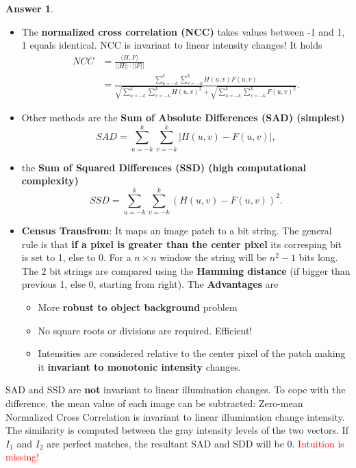 \documentclass[a4paper,12 pt]{article}
\theoremstyle{definition}
\theoremstyle{remark}
\theoremstyle{definition}
\theoremstyle{definition}
\theoremstyle{definition}
\theoremstyle{definition}
\theoremstyle{remark}
\theoremstyle{remark}
\theoremstyle{definition}
\theoremstyle{definition}
\newtheorem*{answer}{Answer}
\begin{document}
\begin{enumerate}
\begin{answer}
\begin{itemize}
\
\item The \textbf{normalized cross correlation (NCC)} takes values between -1 and 1, 1 equals identical. NCC is invariant to linear intensity changes! It holds
\begin{equation}
\begin{split}
NCC&=\frac{\langle H,F \rangle}{||H||\cdot ||F||}\\
&=\frac{\sum_{u=-k}^{k}\sum_{v=-k}^{k}H(u,v)F(u,v)}{\sqrt{\sum_{u=-k}^{k}\sum_{v=-k}^{k}H(u,v)^2}+\sqrt{\sum_{u=-k}^{k}\sum_{v=-k}^{k}F(u,v)^2}}.
\end{split}
\end{equation}
\item Other methods are the \textbf{Sum of Absolute Differences (SAD) (simplest)}
\begin{equation}
SAD=\sum_{u=-k}^{k}\sum_{v=-k}^{k}|H(u,v)-F(u,v)|,
\end{equation}
\item the \textbf{Sum of Squared Differences (SSD) (high computational complexity)}
\begin{equation}
SSD=\sum_{u=-k}^{k}\sum_{v=-k}^{k}(H(u,v)-F(u,v))^2.
\end{equation}
\item \textbf{Census Transfrom}: It maps an image patch to a bit string. The general rule is that \textbf{if a pixel is greater than the center pixel} its corresping bit is set to 1, else to 0. For a $n\times n$ window the string will be $n^2-1$ bits long. The 2 bit strings are compared using the \textbf{Hamming distance} (if bigger than previous 1, else 0, starting from right). The \textbf{Advantages} are
\begin{itemize}
\item More \textbf{robust to object background} problem
\item No square roots or divisions are required. Efficient!
\item Intensities are considered relative to the center pixel of the patch making it \textbf{invariant to monotonic intensity} changes.
\end{itemize}
\end{itemize}
SAD and SSD are \textbf{not} invariant to linear illumination changes. To cope with the difference, the mean value of each image can be subtracted: Zero-mean Normalized Cross Correlation is invariant to linear illumination change intensity. \\
The similarity is computed between the gray intensity levels of the two vectors. If $I_1$ and $I_2$ are perfect matches, the resultant SAD and SDD will be 0. \textcolor{red}{Intuition is missing!}


\end{answer}
\end{enumerate}
\end{document}
